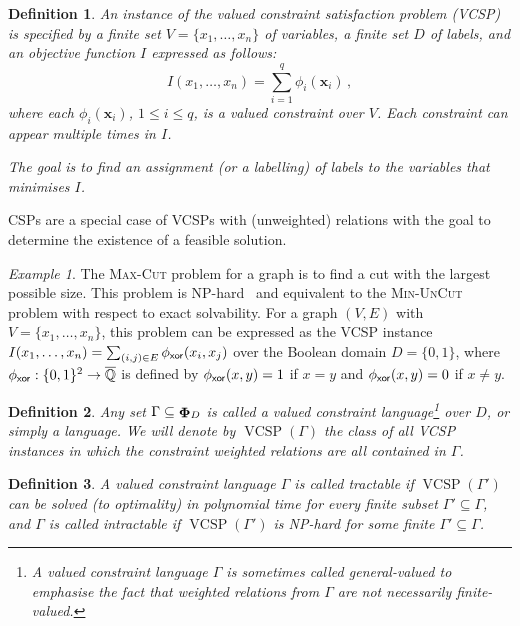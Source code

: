 \documentclass[11pt, reqno]{article}
\newcommand{\inst}{\ensuremath{I}}
\newcommand{\tup}[1]{\ensuremath{\mathbf #1}}
\DeclareMathOperator{\wrel}{{\bf \Phi}}
\DeclareMathOperator{\VCSP}{VCSP}
\newcommand{\qq}{\ensuremath{\overline{\mathbb{Q}}}}
\newtheorem{definition}{Definition}
\theoremstyle{remark}
\newtheorem{example}{Example}
\begin{document}
\begin{definition}
An instance of the \emph{valued constraint satisfaction problem} (VCSP) is specified
by a finite set $V=\{x_1,\ldots,x_n\}$ of variables, a finite set $D$ of labels,
and an \emph{objective function} $\inst$
expressed as follows:
\begin{equation}
\inst(x_1,\ldots, x_n)=\sum_{i=1}^q{\phi_i(\tup{x}_i)}\,,
\label{eq:sepfun}
\end{equation}
where each $\phi_i(\tup{x}_i)$, $1\le i\le q$, is a valued constraint over $V$.
Each constraint can appear multiple times in $\inst$.

The goal is to find an \emph{assignment} (or a \emph{labelling}) of labels to the variables that minimises $\inst$.
\end{definition}

CSPs are a special case of VCSPs with (unweighted) relations with the goal to
determine the existence of a feasible solution.
%
\begin{example} \label{ex:maxcut} The \textsc{Max-Cut} problem for a graph is to
find a cut with the largest possible size. This problem is
NP-hard~\cite{Garey79:intractability}
%
and equivalent to the \textsc{Min-UnCut} problem
with respect to exact solvability.
For a graph $(V,E)$ with $V=\{x_1,\ldots,x_n\}$, this problem can be expressed
as the VCSP instance $\inst(x_1,\ldots,x_n)=\sum_{(i,j)\in E} \phi_{\sf
xor}(x_i,x_j)$ over the Boolean domain $D=\{0,1\}$, where $\phi_{\sf
xor}:\{0,1\}^2\to\qq$ is defined by $\phi_{\sf
xor}(x,y)=1$ if $x=y$ and $\phi_{\sf xor}(x,y)=0$ if $x\neq y$.
%
\end{example}

\begin{definition}
Any set $\Gamma\subseteq\wrel_D$ is called a \emph{valued constraint
language}\footnote{A valued constraint language $\Gamma$ is sometimes called
\emph{general-valued} to emphasise the fact that weighted relations from
$\Gamma$ are not necessarily finite-valued.} over $D$, or simply a \emph{language}. We
will denote by $\VCSP(\Gamma)$ the class of all VCSP instances in which the
constraint weighted relations are all contained in $\Gamma$.
\end{definition}

\begin{definition}
A valued constraint language $\Gamma$ is called \emph{tractable} if
$\VCSP(\Gamma')$ can be solved (to optimality) in
polynomial time for every finite subset $\Gamma'\subseteq\Gamma$, and $\Gamma$
is called \emph{intractable} if $\VCSP(\Gamma')$ is NP-hard for some finite
$\Gamma'\subseteq\Gamma$.
\end{definition}
\end{document}
